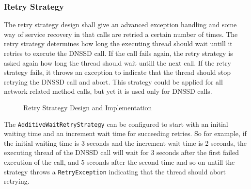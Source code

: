 \subsubsection{Retry Strategy}
The retry strategy design shall give an advanced exception handling and some way of service recovery in that calls are retried a certain number of times. The retry strategy determines how long the executing thread should wait untill it retries to execute the DNSSD call. If the call fails again, the retry strategy is asked again how long the thread should wait untill the next call. If the retry strategy fails, it throws an exception to indicate that the thread should stop retrying the DNSSD call and abort. This strategy could be applied for all network related method calls, but yet it is used only for DNSSD calls. 

\begin{figure}[H]
 \centering
 \caption{Retry Strategy Design and Implementation}
 \label{fig:network.discovery.retrystrategy}
\end{figure}

The \texttt{AdditiveWaitRetryStrategy} can be configured to start with an initial waiting time and an increment wait time for succeeding retries. So for example, if the initial waiting time is 3 seconds and the increment wait time is 2 seconds, the executing thread of the DNSSD call will wait for 3 seconds after the first failed execution of the call, and 5 seconds after the second time and so on untill the strategy throws a \texttt{RetryException} indicating that the thread should abort retrying.





